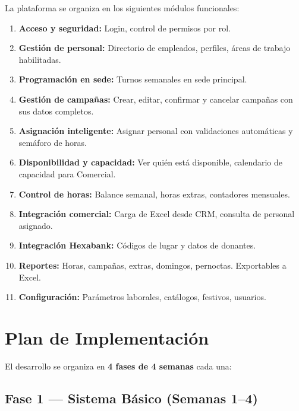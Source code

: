 \documentclass[9pt,a4paper]{extarticle}
\begin{document}
La plataforma se organiza en los siguientes m\'{o}dulos funcionales:

\begin{enumerate}[leftmargin=2em]
    \item \textbf{Acceso y seguridad:} Login, control de permisos por rol.
    \item \textbf{Gesti\'{o}n de personal:} Directorio de empleados, perfiles, \'{a}reas de trabajo habilitadas.
    \item \textbf{Programaci\'{o}n en sede:} Turnos semanales en sede principal.
    \item \textbf{Gesti\'{o}n de campañas:} Crear, editar, confirmar y cancelar campañas con sus datos completos.
    \item \textbf{Asignaci\'{o}n inteligente:} Asignar personal con validaciones autom\'{a}ticas y sem\'{a}foro de horas.
    \item \textbf{Disponibilidad y capacidad:} Ver qui\'{e}n est\'{a} disponible, calendario de capacidad para Comercial.
    \item \textbf{Control de horas:} Balance semanal, horas extras, contadores mensuales.
    \item \textbf{Integraci\'{o}n comercial:} Carga de Excel desde CRM, consulta de personal asignado.
    \item \textbf{Integraci\'{o}n Hexabank:} C\'{o}digos de lugar y datos de donantes.
    \item \textbf{Reportes:} Horas, campañas, extras, domingos, pernoctas. Exportables a Excel.
    \item \textbf{Configuraci\'{o}n:} Par\'{a}metros laborales, cat\'{a}logos, festivos, usuarios.
\end{enumerate}

\newpage

\section{Plan de Implementaci\'{o}n}

El desarrollo se organiza en \textbf{4 fases de 4 semanas} cada una:

\subsection{Fase 1 --- Sistema B\'{a}sico (Semanas 1--4)}
\end{document}
